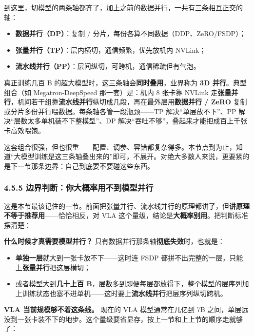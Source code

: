 \documentclass[
  chinese,
]{ctexart}
\providecommand{\tightlist}{%
  \setlength{\itemsep}{0pt}\setlength{\parskip}{0pt}}
\begin{document}
到这里，切模型的两条轴都齐了，加上之前的数据并行，一共有三条相互正交的轴：

\begin{itemize}
\tightlist
\item
  \textbf{数据并行（DP）}：复制 /
  分片，每份各算不同数据（DDP、ZeRO/FSDP）；
\item
  \textbf{张量并行（TP）}：层内横切，通信频繁，优先放机内 NVLink；
\item
  \textbf{流水线并行（PP）}：层间纵切，可跨机，通信稀疏但有气泡。
\end{itemize}

真正训练几百 B 的超大模型时，这三条轴会\textbf{同时叠用}，业界称为
\textbf{3D 并行}。典型组合（如 Megatron-DeepSpeed 那一套）是：机内 8
张卡靠 NVLink
走\textbf{张量并行}，机间若干组靠\textbf{流水线并行}纵切成几段，再在最外层用\textbf{数据并行
/ ZeRO} 复制或分片多份并行喂数据。每条轴各管一段瓶颈------TP
解决``单层放不下''、PP 解决``层数太多单机装不下整模型''、DP
解决``吞吐不够''，叠起来才能把成百上千张卡高效喂饱。

这套组合很强，但也很重------配置、调参、容错都复杂得多。本节点到为止，知道``大模型训练是这三条轴叠出来的''即可，不展开。对绝大多数人来说，更要紧的是下一节那条边界：自己到底要不要碰这些东西。

\subsubsection{4.5.5
边界判断：你大概率用不到模型并行}\label{ux8fb9ux754cux5224ux65adux4f60ux5927ux6982ux7387ux7528ux4e0dux5230ux6a21ux578bux5e76ux884c}

这是本节最该记住的一节。前面把张量并行、流水线并行的原理都讲了，但\textbf{讲原理不等于推荐用}------恰恰相反，对
VLA 这个量级，结论是\textbf{大概率别用}。把判断标准摆清楚：

\textbf{什么时候才真需要模型并行？}
只有数据并行那条轴\textbf{彻底失效}时，也就是：

\begin{itemize}
\tightlist
\item
  \textbf{单独一层}就大到一张卡放不下------这时连 FSDP
  都拼不出完整的一层，只能上\textbf{张量并行}把这层横切；
\item
  或者模型大到\textbf{几十上百
  B}，层数多到即便每层都放得下，整个模型的层序列加上训练状态也塞不进单机------这时要上\textbf{流水线并行}把层序列纵切跨机。
\end{itemize}

\textbf{VLA 当前规模够不着这条线。} 现在的 VLA 模型通常在几亿到 7B
之间，单层远没到一张卡装不下的地步。这个量级要省显存，按上一节和上上节的顺序走就够了：
\end{document}
